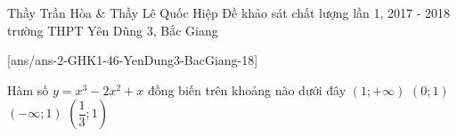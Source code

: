 \begin{name}
{Thầy Trần Hòa \& Thầy Lê Quốc Hiệp}
{Đề khảo sát chất lượng lần 1, 2017 - 2018 trường THPT Yên Dũng 3, Bắc Giang}
\end{name}
\setcounter{ex}{0}
[ans/ans-2-GHK1-46-YenDung3-BacGiang-18]
\begin{ex}%
Hàm số $y=x^3-2x^2+x$ đồng biến trên khoảng nào dưới đây
\choice
{\True $(1;+\infty)$}
{$(0;1)$}
{$(-\infty;1)$}
{$\left(\dfrac{1}{3};1\right)$}
\loigiai{
$y^\prime = 3x^2 -4x +1$.\\
$y^\prime \ge 0 \Leftrightarrow x \in \left( -\infty; \dfrac{1}{3} \right] \cup [1; +\infty)$.\\
Vậy hàm số đồng biến trên khoảng $(1;+\infty)$.}
\end{ex}

